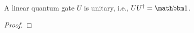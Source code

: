 		\begin{theorem}
			A linear quantum gate \(U\) is unitary, i.e., \( U U^\dagger = \ID \).
		\end{theorem}
		\begin{proof}

\end{proof}
